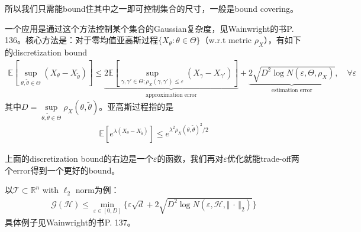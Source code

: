 \documentclass[11pt,a4paper]{ctexart}
\numberwithin{equation}{section}%
\begin{document}
所以我们只需能bound住其中之一即可控制集合的尺寸，一般是bound covering。

一个应用是通过这个方法控制某个集合的Gaussian复杂度，见Wainwright的书P. 136。核心方法是：对于零均值亚高斯过程$ \{X_\theta : \theta \in \Theta\} $（w.r.t metric $ \rho _X $），有如下的discretization bound
\begin{align*}
    \mathbb{E}\left[ \mathop{ \sup  }\limits_{\theta ,\tilde{\theta }\in \Theta} (X_\theta -X_{\tilde{\theta }})  \right]  \leq \underbrace{2\mathbb{E}\left[ \mathop{ \sup  }\limits_{\gamma ,\gamma '\in \Theta; \rho _X(\gamma ,\gamma ')\leq \varepsilon } (X_\gamma - X_{\gamma '} )  \right] }_\text{approximation error} + \underbrace{2\sqrt{ D^2\log N(\varepsilon , \Theta, \rho _X) } }_\text{estimation error},\quad \forall \varepsilon 
\end{align*}
其中$ D=\mathop{ \sup  }\limits_{\theta ,\tilde{\theta }\in \Theta} \rho _X(\theta ,\tilde{\theta })  $。亚高斯过程指的是
\begin{align*}
    \mathbb{E}\left[ e^{\lambda (X_\theta -X_{\tilde{\theta }} )} \right] \leq e^{\lambda^2 \rho _X(\theta ,\tilde{\theta} )^2/2} 
\end{align*}

上面的discretization bound的右边是一个$ \varepsilon  $的函数，我们再对$ \varepsilon  $优化就能trade-off两个error得到一个更好的bound。

以$ \mathcal{T}\subset \mathbb{R}^n $ with $ \ell_2 $ norm为例：
\begin{align*}
    \mathcal{G}(\mathcal{H})\leq \mathop{ \min  }\limits_{\varepsilon \in [0,D]}\Big\{ \varepsilon \sqrt{d} + 2\sqrt{ D^2\log N(\varepsilon , \mathcal{H}, \left\Vert \, \cdot \,  \right\Vert _2) }          \Big\}  
\end{align*}
具体例子见Wainwright的书P. 137。
\end{document}
